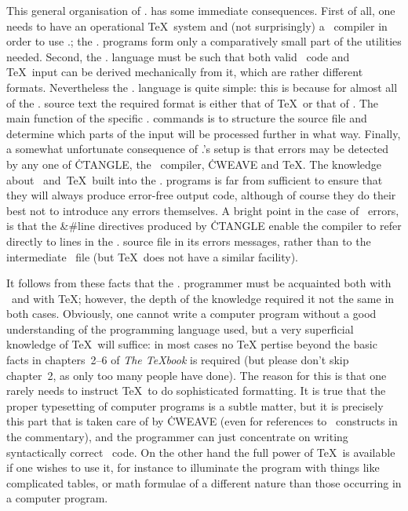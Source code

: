 This general organisation of \CWEB. has some immediate consequences. First
of all, one needs to have an operational \TeX~system and (not surprisingly)
a \Cee~compiler in order to use \CWEB.; the \CWEB. programs form only a
comparatively small part of the utilities needed. Second, the \CWEB.
language must be such that both valid \Cee~code and \TeX~input can be
derived mechanically from it, which are rather different formats.
Nevertheless the \CWEB. language is quite simple: this is because for almost
all of the \CWEB. source text the required format is either that of \TeX\ or
that of \Cee. The main function of the specific \CWEB. commands is to
structure the source file and determine which parts of the input will be
processed further in what way. Finally, a somewhat unfortunate consequence
of \CWEB.'s setup is that errors may be detected by any one of \.{CTANGLE},
the \Cee~compiler, \.{CWEAVE} and \TeX. The knowledge about \Cee~and~\TeX\
built into the \CWEB. programs is far from sufficient to ensure that they
will always produce error-free output code, although of course they do their
best not to introduce any errors themselves. A bright point in the case of
\Cee~errors, is that the \&{\#line} directives produced by \.{CTANGLE} enable
the compiler to refer directly to lines in the \CWEB. source file in its
errors messages, rather than to the intermediate \Cee~file (but \TeX\ does
not have a similar facility).

It follows from these facts that the \CWEB. programmer must be acquainted
both with \Cee\ and with \TeX; however, the depth of the knowledge required
it not the same in both cases. Obviously, one cannot write a computer
program without a good understanding of the programming language used, but a
very superficial knowledge of \TeX\ will suffice: in most cases no \TeX
pertise beyond the basic facts in chapters~2--6 of {\sl The \TeX book\/} is
required (but please don't skip chapter~2, as only too many people have
done). The reason for this is that one rarely needs to instruct \TeX\ to do
sophisticated formatting. It is true that the proper typesetting of computer
programs is a subtle matter, but it is precisely this part that is taken
care of by \.{CWEAVE} (even for references to \Cee~constructs in the
commentary), and the programmer can just concentrate on writing
syntactically correct \Cee~code. On the other hand the full power of \TeX\
is available if one wishes to use it, for instance to illuminate the program
with things like complicated tables, or math formulae of a different nature
than those occurring in a computer program.

